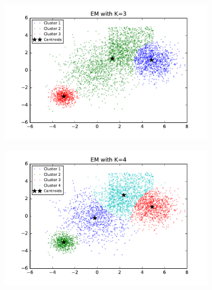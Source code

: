 \begin{figure}[htb]
        \centering
        \begin{subfigure}[b]{0.475\textwidth}
            \centering
            \includegraphics[width=\textwidth]{./figures/bigClustering_EM_3.pdf}
        \end{subfigure}
        \hfill
        \begin{subfigure}[b]{0.475\textwidth}  
            \centering 
            \includegraphics[width=\textwidth]{./figures/bigClustering_EM_4.pdf}
        \end{subfigure}
        \begin{subfigure}[b]{0.475\textwidth}  
            \centering 

\end{subfigure}
\end{figure}
